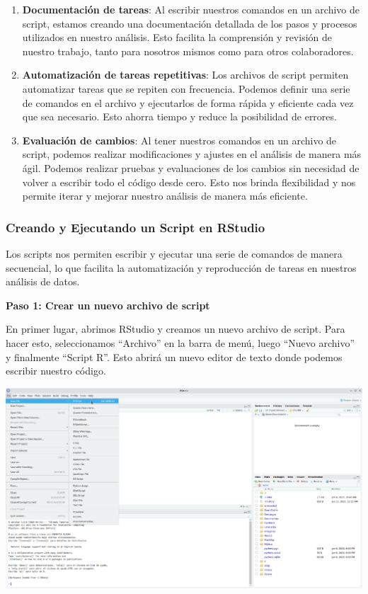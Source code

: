 \documentclass[
  a4paper,
]{article}
\begin{document}
\begin{enumerate}
\def\labelenumi{\arabic{enumi}.}
\item
  \textbf{Documentación de tareas}: Al escribir nuestros comandos en un
  archivo de script, estamos creando una documentación detallada de los
  pasos y procesos utilizados en nuestro análisis. Esto facilita la
  comprensión y revisión de nuestro trabajo, tanto para nosotros mismos
  como para otros colaboradores.
\item
  \textbf{Automatización de tareas repetitivas}: Los archivos de script
  permiten automatizar tareas que se repiten con frecuencia. Podemos
  definir una serie de comandos en el archivo y ejecutarlos de forma
  rápida y eficiente cada vez que sea necesario. Esto ahorra tiempo y
  reduce la posibilidad de errores.
\item
  \textbf{Evaluación de cambios}: Al tener nuestros comandos en un
  archivo de script, podemos realizar modificaciones y ajustes en el
  análisis de manera más ágil. Podemos realizar pruebas y evaluaciones
  de los cambios sin necesidad de volver a escribir todo el código desde
  cero. Esto nos brinda flexibilidad y nos permite iterar y mejorar
  nuestro análisis de manera más eficiente.
\end{enumerate}

\hypertarget{creando-y-ejecutando-un-script-en-rstudio}{%
\subsubsection{Creando y Ejecutando un Script en
RStudio}\label{creando-y-ejecutando-un-script-en-rstudio}}

Los scripts nos permiten escribir y ejecutar una serie de comandos de
manera secuencial, lo que facilita la automatización y reproducción de
tareas en nuestros análisis de datos.

\textbf{Paso 1: Crear un nuevo archivo de script}

En primer lugar, abrimos RStudio y creamos un nuevo archivo de script.
Para hacer esto, seleccionamos ``Archivo'' en la barra de menú, luego
``Nuevo archivo'' y finalmente ``Script R''. Esto abrirá un nuevo editor
de texto donde podemos escribir nuestro código.

\includegraphics{images/Screenshot_20230611_001234.png}
\end{document}
